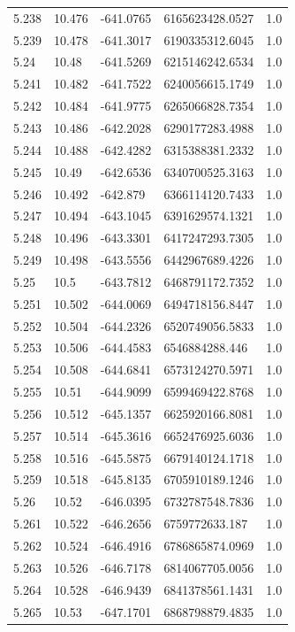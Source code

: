 \begin{tabular}{lllll}
5.238 & 10.476 & -641.0765 & 6165623428.0527 & 1.0 \\
5.239 & 10.478 & -641.3017 & 6190335312.6045 & 1.0 \\
5.24 & 10.48 & -641.5269 & 6215146242.6534 & 1.0 \\
5.241 & 10.482 & -641.7522 & 6240056615.1749 & 1.0 \\
5.242 & 10.484 & -641.9775 & 6265066828.7354 & 1.0 \\
5.243 & 10.486 & -642.2028 & 6290177283.4988 & 1.0 \\
5.244 & 10.488 & -642.4282 & 6315388381.2332 & 1.0 \\
5.245 & 10.49 & -642.6536 & 6340700525.3163 & 1.0 \\
5.246 & 10.492 & -642.879 & 6366114120.7433 & 1.0 \\
5.247 & 10.494 & -643.1045 & 6391629574.1321 & 1.0 \\
5.248 & 10.496 & -643.3301 & 6417247293.7305 & 1.0 \\
5.249 & 10.498 & -643.5556 & 6442967689.4226 & 1.0 \\
5.25 & 10.5 & -643.7812 & 6468791172.7352 & 1.0 \\
5.251 & 10.502 & -644.0069 & 6494718156.8447 & 1.0 \\
5.252 & 10.504 & -644.2326 & 6520749056.5833 & 1.0 \\
5.253 & 10.506 & -644.4583 & 6546884288.446 & 1.0 \\
5.254 & 10.508 & -644.6841 & 6573124270.5971 & 1.0 \\
5.255 & 10.51 & -644.9099 & 6599469422.8768 & 1.0 \\
5.256 & 10.512 & -645.1357 & 6625920166.8081 & 1.0 \\
5.257 & 10.514 & -645.3616 & 6652476925.6036 & 1.0 \\
5.258 & 10.516 & -645.5875 & 6679140124.1718 & 1.0 \\
5.259 & 10.518 & -645.8135 & 6705910189.1246 & 1.0 \\
5.26 & 10.52 & -646.0395 & 6732787548.7836 & 1.0 \\
5.261 & 10.522 & -646.2656 & 6759772633.187 & 1.0 \\
5.262 & 10.524 & -646.4916 & 6786865874.0969 & 1.0 \\
5.263 & 10.526 & -646.7178 & 6814067705.0056 & 1.0 \\
5.264 & 10.528 & -646.9439 & 6841378561.1431 & 1.0 \\
5.265 & 10.53 & -647.1701 & 6868798879.4835 & 1.0 \\

\end{tabular}
